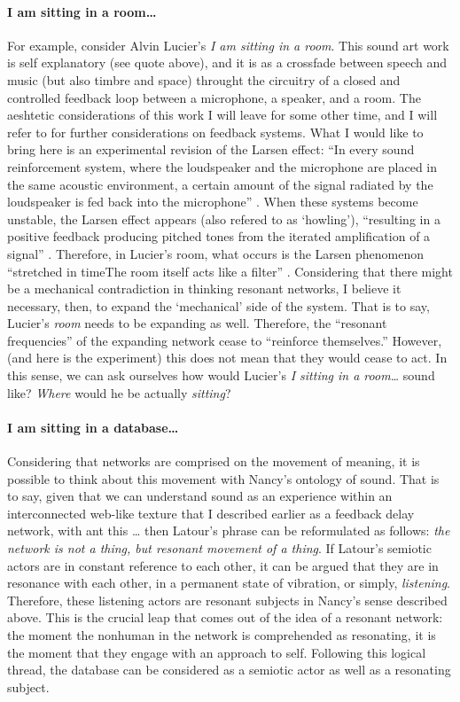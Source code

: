 \paragraph{I am sitting in a room\dots}
For example, consider Alvin Lucier's \textit{I am sitting in a room}. This sound art work is self explanatory (see quote above), and it is as a crossfade between speech and music (but also timbre and space) throught the circuitry of a closed and controlled feedback loop between a microphone, a speaker, and a room. The aeshtetic considerations of this work I will leave for some other time, and I will refer to \textcite{icmc/bbp2372.2012.006} for further considerations on feedback systems. What I would like to bring here is an experimental revision of the Larsen effect: ``In every sound reinforcement system, where the loudspeaker and the microphone are placed in the same acoustic environment, a certain amount of the signal radiated by the loudspeaker is fed back into the microphone'' \parencite[11]{Kro11:Aco}. When these systems become unstable, the Larsen effect appears (also refered to as `howling'), ``resulting in a positive feedback producing pitched tones from the iterated amplification of a signal'' \parencite[31]{icmc/bbp2372.2012.006}. Therefore, in Lucier's room, what occurs is the Larsen phenomenon ``stretched in time\doots The room itself acts like a filter'' \parencite[34]{icmc/bbp2372.2012.006}. Considering that there might be a mechanical contradiction in thinking resonant networks, I believe it necessary, then, to expand the `mechanical' side of the system. That is to say, Lucier's \textit{room} needs to be expanding as well. Therefore, the ``resonant frequencies'' of the expanding network cease to ``reinforce themselves.'' However, (and here is the experiment) this does not mean that they would cease to act. In this sense, we can ask ourselves how would Lucier's \textit{I sitting in a room\dots} sound like? \textit{Where} would he be actually \textit{sitting}?

\paragraph{I am sitting in a database\dots}
Considering that networks are comprised on the movement of meaning, it is possible to think about this movement with Nancy's ontology of sound. That is to say, given that we can understand sound as an experience within an interconnected web-like texture that I described earlier as a feedback delay network, with \gls{ant} this 
\dots
then Latour's phrase can be reformulated as follows: \textit{the network is not a thing, but resonant movement of a thing}. If Latour's semiotic actors are in constant reference to each other, it can be argued that they are in resonance with each other, in a permanent state of vibration, or simply, \textit{listening}. Therefore, these listening actors are resonant subjects in Nancy's sense described above. This is the crucial leap that comes out of the idea of a resonant network: the moment the nonhuman in the network is comprehended as resonating, it is the moment that they engage with an approach to self. Following this logical thread, the database can be considered as a semiotic actor as well as a resonating subject. 




